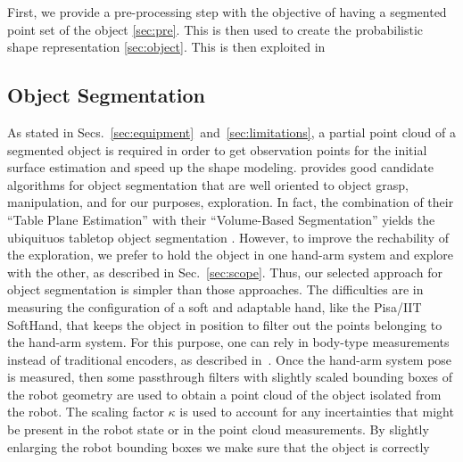 First, we provide a pre-processing step with the objective of having a segmented
point  set  of  the object  \ref{sec:pre}.  This  is  then  used to  create  the
probabilistic shape representation \ref{sec:object}. This is then exploited in

\subsection{Object Segmentation}
\label{sec:segmentation}

As stated in Secs.~\ref{sec:equipment}~and~\ref{sec:limitations}, a partial point cloud
of a segmented object is required in order to get observation points for the initial
surface estimation and speed up the shape modeling.
\citet[Sec.~III.A]{Hudson2012Endtoend}  provides  good   candidate algorithms  for  object
segmentation  that are  well oriented  to  object grasp,  manipulation, and  for
our  purposes, exploration.  In fact,  the  combination of  their ``Table  Plane
Estimation''  with their  ``Volume-Based  Segmentation''  yields the  ubiquituos
tabletop object segmentation \citep{TabletopObjectDetector}. However, to improve
the  rechability  of the  exploration,  we  prefer to  hold  the  object in  one
hand-arm system and explore with the other, as described in Sec.~\ref{sec:scope}.
Thus,  our selected  approach  for  object segmentation  is  simpler than  those
approaches.  The  difficulties are  in  measuring  the  configuration of  a  soft
and  adaptable  hand, like the Pisa/IIT SoftHand,
that  keeps  the  object  in  position  to  filter  out
the  points  belonging  to  the  hand-arm system.  For  this  purpose,  one  can
rely in  body-type measurements  instead of  traditional encoders,  as described
in~\citet{Santaera2015Lowcost}.
Once the hand-arm  system pose is measured, then
some   passthrough filters with slightly  scaled bounding boxes of  the robot
geometry  are used  to obtain  a  point cloud  of  the object  isolated from  the
robot. The scaling factor $\kappa$ is used to account for any incertainties that might
be present in the robot state or in the point cloud measurements. 
By slightly enlarging the robot bounding boxes we make sure that the object is correctly
